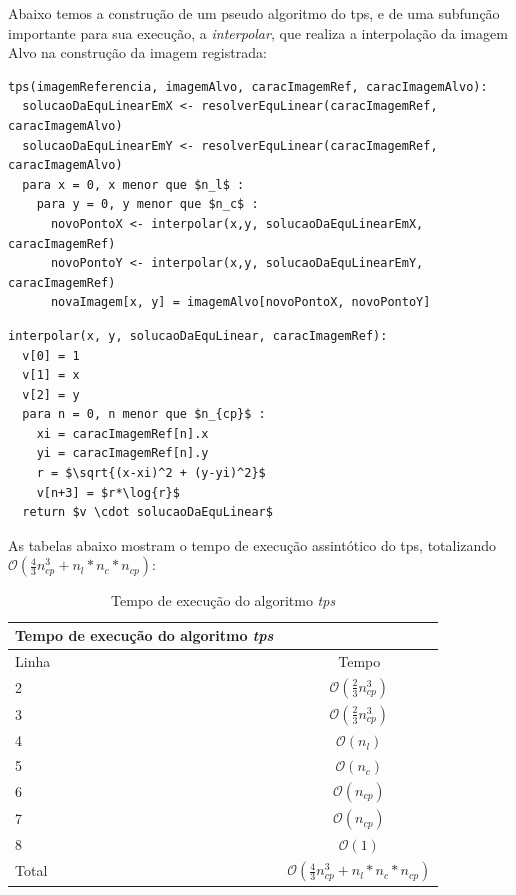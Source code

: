   Abaixo temos a construção de um pseudo algoritmo do tps, e de uma subfunção importante para sua execução, a
\textit{interpolar}, que realiza a interpolação da imagem Alvo na construção da imagem registrada:

\begin{lstlisting}[mathescape]
tps(imagemReferencia, imagemAlvo, caracImagemRef, caracImagemAlvo):
  solucaoDaEquLinearEmX <- resolverEquLinear(caracImagemRef, caracImagemAlvo)
  solucaoDaEquLinearEmY <- resolverEquLinear(caracImagemRef, caracImagemAlvo)
  para x = 0, x menor que $n_l$ :
    para y = 0, y menor que $n_c$ :
      novoPontoX <- interpolar(x,y, solucaoDaEquLinearEmX, caracImagemRef)
      novoPontoY <- interpolar(x,y, solucaoDaEquLinearEmY, caracImagemRef)
      novaImagem[x, y] = imagemAlvo[novoPontoX, novoPontoY]
\end{lstlisting}

\begin{lstlisting}[mathescape]
interpolar(x, y, solucaoDaEquLinear, caracImagemRef):
  v[0] = 1
  v[1] = x
  v[2] = y
  para n = 0, n menor que $n_{cp}$ :
    xi = caracImagemRef[n].x
    yi = caracImagemRef[n].y
    r = $\sqrt{(x-xi)^2 + (y-yi)^2}$
    v[n+3] = $r*\log{r}$
  return $v \cdot solucaoDaEquLinear$
\end{lstlisting}

  As tabelas abaixo mostram o tempo de execução assintótico do tps, totalizando
$\mathcal{O}(\frac{4}{3}n_{cp}^3+n_l*n_c*n_{cp})$:

\begin{table}[H]
\begin{center}
\begin{tabular}{l|c}
\hline
Tempo de execução do algoritmo \textit{tps} \\
\hline
Linha&Tempo\\
\hline
2       &$\mathcal{O}(\frac{2}{3}n_{cp}^3)$\\
3       &$\mathcal{O}(\frac{2}{3}n_{cp}^3)$\\
4       &$\mathcal{O}(n_l)$\\
5       &$\mathcal{O}(n_c)$\\
6       &$\mathcal{O}(n_{cp})$\\
7       &$\mathcal{O}(n_{cp})$\\
8       &$\mathcal{O}(1)$\\
\hline
Total   &$\mathcal{O}(\frac{4}{3}n_{cp}^3+n_l*n_c*n_{cp})$\\
\hline
\end{tabular}
\caption{Tempo de execução do algoritmo \textit{tps}}
\label{table:tps}
\end{center}
\end{table}

